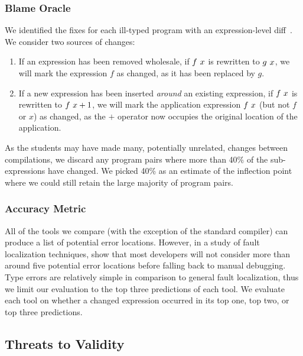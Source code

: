 \subsubsection{Blame Oracle}
We identified the fixes for each ill-typed program with an
expression-level diff~\citep{Lempsink2009-xf}.
%
We consider two sources of changes:
%
\begin{enumerate}
\item If an expression has been removed wholesale, \eg if $f\ x$
  is rewritten to $g\ x$, we will mark the expression $f$ as
  changed, as it has been replaced by $g$.
\item If a new expression has been inserted \emph{around} an existing
  expression, \eg if $f\ x$ is rewritten to
  $f\ x + 1$, we will mark the application expression
  $f\ x$ (but not $f$ or $x$) as changed, as the $+$ operator now
  occupies the original location of the application.
\end{enumerate}
%
As the students may have made many, potentially unrelated, changes
between compilations, we discard any program pairs where more than 40\%
of the sub-expressions have changed.
%
We picked 40\% as an estimate of the inflection point where we could
still retain the large majority of program pairs.


\subsubsection{Accuracy Metric}
All of the tools we compare (with the exception of the standard \ocaml
compiler) can produce a list of potential error locations. 
%
However, in a study of fault localization techniques,
\citet{Kochhar2016-oc} show that most developers will not consider more
than around five potential error locations before falling back to manual
debugging.
%
Type errors are relatively simple in comparison to general fault
localization, thus we limit our evaluation to the top three predictions
of each tool.
%
We evaluate each tool on whether a changed expression occurred in its
top one, top two, or top three predictions.





\subsection{Threats to Validity} 

